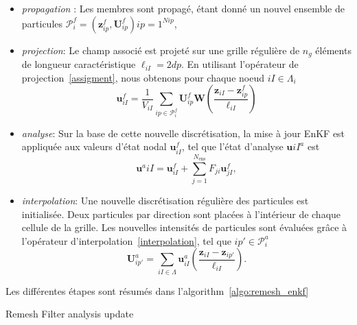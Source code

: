 \begin{itemize}
\begin{itemize}
    \item \textit{propagation} : Les membres sont propagé, étant donné un nouvel ensemble de particules $\mathcal{P}^f_i = {(\bm z^f_{ip}, \bm U^f_{ip})}{ip = 1}^{N{ip}}$,
    \item \textit{projection}: Le champ associé est projeté sur une grille régulière de $n_g$ éléments de longueur caractéristique $\ell_{iI}= 2dp$. En utilisant l'opérateur de projection~\ref{assigment}, nous obtenons pour chaque noeud $iI \in \Lambda_{i}$
          \begin{equation*}
              \bm{u}^f_{iI} = \frac1{V_{iI}} \sum_{ip \in \mathcal P^f_i} \bm U^f_{ip} \bm W \left(\frac{\bm z_{iI} - \bm z^f_{ip}}{\ell_{iI}} \right)
          \end{equation*}
    \item \textit{analyse}: Sur la base de cette nouvelle discrétisation, la mise à jour EnKF est appliquée aux valeurs d'état nodal $\bm{u}^f_{iI}$, tel que l'état d'analyse $\bm{u}{iI}^a$ est
          \begin{equation*}
              \bm{u}^a{iI} = \bm{u}^f_{iI} + \sum_{j=1}^{N_{\text{ens}}} F_{ji} \bm{u}^f_{jI},
          \end{equation*}
    \item \textit{interpolation}: Une nouvelle discrétisation régulière des particules est initialisée. Deux particules par direction sont placées à l'intérieur de chaque cellule de la grille. Les nouvelles intensités de particules sont évaluées grâce à l'opérateur d'interpolation~\ref{interpolation}, tel que $ip' \in \mathcal P_i^a$
          \begin{equation*}
              \bm U_{ip'}^a = \sum_{iI \in \Lambda} \bm u^a_{iI} \left(\frac{\bm z_{iI} - \bm z_{ip'}}{\ell_{iI}} \right).
          \end{equation*}
\end{itemize}

Les différentes étapes sont résumés dans l'algorithm~\ref{algo:remesh_enkf}

\begin{algorithm}

    \caption{Remesh Filter analysis update}~\label{algo:remesh_enkf}



\end{algorithm}
\end{itemize}
